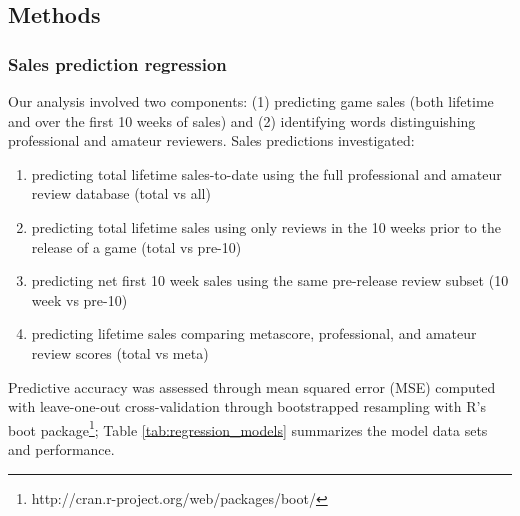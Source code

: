 \documentclass[letterpaper]{article}
\begin{document}
\subsection{Methods}
\subsubsection{Sales prediction regression}
Our analysis involved two components: (1) predicting game sales (both lifetime and over the first 10 weeks of sales) and (2) identifying words distinguishing professional and amateur reviewers. Sales predictions investigated: 
\begin{enumerate}
\item predicting total lifetime sales-to-date using the full professional and amateur review database (total vs all)
\item predicting total lifetime sales using only reviews in the 10 weeks prior to the release of a game (total vs pre-10)
\item predicting net first 10 week sales using the same pre-release review subset (10 week vs pre-10)
\item predicting lifetime sales comparing metascore, professional, and amateur review scores (total vs meta)
\end{enumerate}
Predictive accuracy was assessed through mean squared error (MSE) computed with leave-one-out cross-validation through bootstrapped resampling with R's boot package\footnote{http://cran.r-project.org/web/packages/boot/}; Table \ref{tab:regression_models} summarizes the model data sets and performance.
\end{document}
